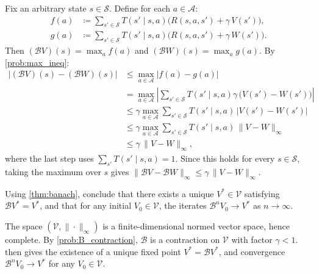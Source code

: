 \documentclass[11pt]{article}
\newcommand{\cS}{\mathcal{S}}
\newcommand{\cA}{\mathcal{A}}
\begin{document}
\begin{solution}
Fix an arbitrary state $s \in \cS$. Define for each $a \in \cA$:
\begin{align*}
f(a) &\coloneqq \sum_{s' \in \cS} T(s' \mid s, a)\bigl(R(s,a,s') + \gamma\, V(s')\bigr), \\
g(a) &\coloneqq \sum_{s' \in \cS} T(s' \mid s, a)\bigl(R(s,a,s') + \gamma\, W(s')\bigr).
\end{align*}
Then $(\mathcal{B}V)(s) = \max_a f(a)$ and $(\mathcal{B}W)(s) = \max_a g(a)$. By \cref{prob:max_ineq}:
\begin{align*}
\big|(\mathcal{B}V)(s) - (\mathcal{B}W)(s)\big| &\le \max_{a \in \cA} \big|f(a) - g(a)\big| \\
&=  \max_{a \in \cA} \left|\sum_{s' \in \cS} T(s' \mid s, a)\gamma\,\bigl(V(s') - W(s')\bigr)\right| \\
&\le \gamma \max_{a \in \cA} \sum_{s' \in \cS} T(s' \mid s, a)\,\big|V(s') - W(s')\big| \\
&\le \gamma \max_{a \in \cA} \sum_{s' \in \cS} T(s' \mid s, a)\,\|V - W\|_\infty \\
&\le \gamma\,\|V - W\|_\infty,
\end{align*}
where the last step uses $\sum_{s'} T(s' \mid s, a) = 1$. Since this holds for every $s \in \cS$, taking the maximum over $s$ gives $\|\mathcal{B}V - \mathcal{B}W\|_\infty \le \gamma\,\|V - W\|_\infty$.
\end{solution}

\begin{exercise}
\label{prob:V_star_exists} Using \cref{thm:banach}, conclude that there exists a unique $V^* \in \mathcal{V}$ satisfying $\mathcal{B} V^* = V^*$, and that for any initial $V_0 \in \mathcal{V}$, the iterates $\mathcal{B}^n V_0 \to V^*$ as $n \to \infty$.
\end{exercise}

\begin{solution}
The space $(\mathcal{V}, \|\cdot\|_\infty)$ is a finite-dimensional normed vector space, hence complete. By \cref{prob:B_contraction}, $\mathcal{B}$ is a contraction on $\mathcal{V}$ with factor $\gamma < 1$.  then gives the existence of a unique fixed point $V^* = \mathcal{B}V^*$, and convergence $\mathcal{B}^n V_0 \to V^*$ for any $V_0 \in \mathcal{V}$.
\end{solution}
\end{document}
